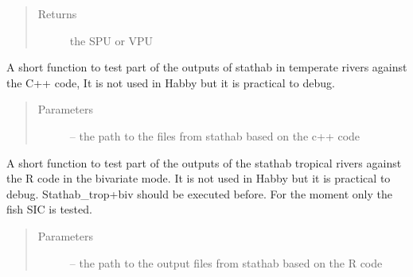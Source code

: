 \documentclass[letterpaper,10pt,english]{sphinxmanual}
\begin{document}
\begin{fulllineitems}
\begin{fulllineitems}
\begin{quote}
\begin{description}
\item[{Returns}] \leavevmode
the SPU or VPU

\end{description}\end{quote}

\end{fulllineitems}


\begin{fulllineitems}
\label{\detokenize{index:src.stathab_c.Stathab.test_stathab}}
A short function to test part of the outputs of stathab in temperate rivers against the C++ code,
It is not used in Habby but it is practical to debug.
\begin{quote}\begin{description}
\item[{Parameters}] \leavevmode
{} -- the path to the files from stathab based on the c++ code

\end{description}\end{quote}

\end{fulllineitems}


\begin{fulllineitems}
\label{\detokenize{index:src.stathab_c.Stathab.test_stathab_trop_biv}}
A short function to test part of the outputs of the stathab tropical rivers against the R code
in the bivariate mode. It is not used in Habby but it is practical to debug. Stathab\_trop+biv should be
executed before. For the moment only the fish SIC is tested.
\begin{quote}\begin{description}
\item[{Parameters}] \leavevmode
{} -- the path to the output files from stathab based on the R code

\end{description}\end{quote}

\end{fulllineitems}



\end{fulllineitems}
\end{document}
